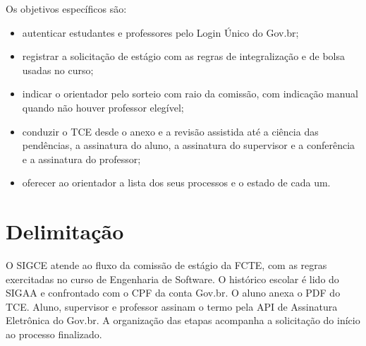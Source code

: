 Os objetivos específicos são:

\begin{itemize}
    \item autenticar estudantes e professores pelo Login Único do Gov.br;
    \item registrar a solicitação de estágio com as regras de integralização e de bolsa usadas no curso;
    \item indicar o orientador pelo sorteio com raio da comissão, com indicação manual quando não houver professor elegível;
    \item conduzir o TCE desde o anexo e a revisão assistida até a ciência das pendências, a assinatura do aluno, a assinatura do supervisor e a conferência e a assinatura do professor;
    \item oferecer ao orientador a lista dos seus processos e o estado de cada um.
\end{itemize}

\section{Delimitação}

O SIGCE atende ao fluxo da comissão de estágio da FCTE, com as regras exercitadas no curso de Engenharia de Software. O histórico escolar é lido do SIGAA e confrontado com o CPF da conta Gov.br. O aluno anexa o PDF do TCE. Aluno, supervisor e professor assinam o termo pela API de Assinatura Eletrônica do Gov.br. A organização das etapas acompanha a solicitação do início ao processo finalizado.
